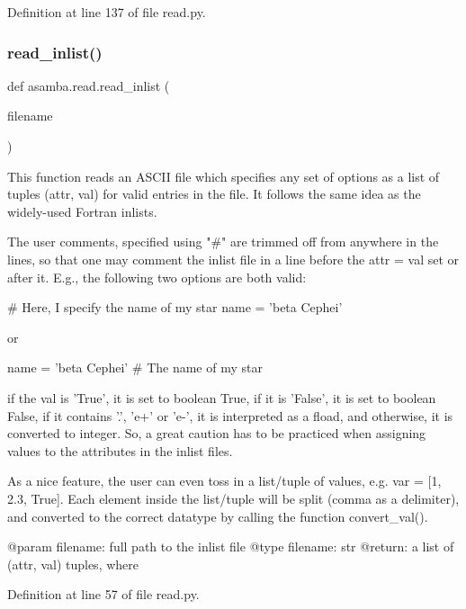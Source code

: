 Definition at line 137 of file read.\+py.

\mbox{\label{namespaceasamba_1_1read_a1506842017eb500635c24715c4336084}} 
\subsubsection{\texorpdfstring{read\+\_\+inlist()}{read\_inlist()}}
{\footnotesize\ttfamily def asamba.\+read.\+read\+\_\+inlist (\begin{DoxyParamCaption}\item[{}]{filename }\end{DoxyParamCaption})}

\begin{DoxyVerb}This function reads an ASCII file which specifies any set of options as a list of tuples (attr, val) for 
valid entries in the file. It follows the same idea as the widely-used Fortran inlists.

The user comments, specified using "#" are trimmed off from anywhere in the lines, so that one may comment 
the inlist file in a line before the attr = val set or after it. E.g., the following two options are both 
valid:

   # Here, I specify the name of my star
   name = 'beta Cephei'

or 

   name = 'beta Cephei'  # The name of my star

if the val is 'True', it is set to boolean True, if it is 'False', it is set to boolean False, if it contains
'.', 'e+' or 'e-', it is interpreted as a fload, and otherwise, it is converted to integer. So, a great caution
has to be practiced when assigning values to the attributes in the inlist files.

As a nice feature, the user can even toss in a list/tuple of values, e.g. var = [1, 2.3, True]. Each element inside
the list/tuple will be split (comma as a delimiter), and converted to the correct datatype by calling the 
function convert_val().

@param filename: full path to the inlist file
@type filename: str
@return: a list of (attr, val) tuples, where 
\end{DoxyVerb}
 

Definition at line 57 of file read.\+py.

